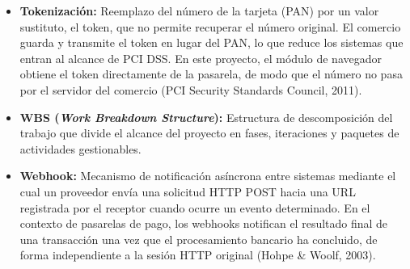 \begin{itemize}
  \item \textbf{Tokenización:} Reemplazo del número de la tarjeta (PAN) por un valor sustituto, el token, que no permite recuperar el número original. El comercio guarda y transmite el token en lugar del PAN, lo que reduce los sistemas que entran al alcance de PCI DSS. En este proyecto, el módulo de navegador obtiene el token directamente de la pasarela, de modo que el número no pasa por el servidor del comercio (PCI Security Standards Council, 2011).
  \item \textbf{WBS (\textit{Work Breakdown Structure}):} Estructura de descomposición del trabajo que divide el alcance del proyecto en fases, iteraciones y paquetes de actividades gestionables.
  \item \textbf{Webhook:} Mecanismo de notificación asíncrona entre sistemas mediante el cual un proveedor envía una solicitud HTTP POST hacia una URL registrada por el receptor cuando ocurre un evento determinado. En el contexto de pasarelas de pago, los webhooks notifican el resultado final de una transacción una vez que el procesamiento bancario ha concluido, de forma independiente a la sesión HTTP original (Hohpe \& Woolf, 2003).
\end{itemize}

